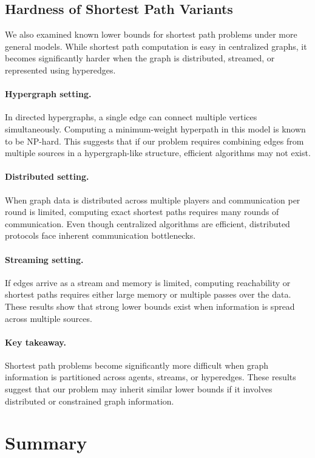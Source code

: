 \subsection{Hardness of Shortest Path Variants}

We also examined known lower bounds for shortest path problems under more
general models. While shortest path computation is easy in centralized graphs,
it becomes significantly harder when the graph is distributed, streamed, or
represented using hyperedges.

\paragraph{Hypergraph setting.}
In directed hypergraphs, a single edge can connect multiple vertices
simultaneously. Computing a minimum-weight hyperpath in this model is known to
be NP-hard. This suggests that if our problem requires combining edges from
multiple sources in a hypergraph-like structure, efficient algorithms may not
exist.

\paragraph{Distributed setting.}
When graph data is distributed across multiple players and communication per
round is limited, computing exact shortest paths requires many rounds of
communication. Even though centralized algorithms are efficient, distributed
protocols face inherent communication bottlenecks.

\paragraph{Streaming setting.}
If edges arrive as a stream and memory is limited, computing reachability or
shortest paths requires either large memory or multiple passes over the data.
These results show that strong lower bounds exist when information is spread
across multiple sources.

\paragraph{Key takeaway.}
Shortest path problems become significantly more difficult when graph
information is partitioned across agents, streams, or hyperedges. These results
suggest that our problem may inherit similar lower bounds if it involves
distributed or constrained graph information.

\section{Summary}

